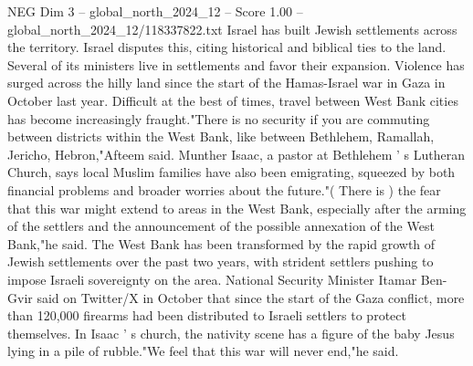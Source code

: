 \begin{textsample}{NEG Dim 3 – global\_north\_2024\_12 – Score 1.00 – global\_north\_2024\_12/118337822.txt}
Israel has built Jewish settlements across the territory.
Israel disputes this, citing historical and biblical ties to the land.
Several of its ministers live in settlements and favor their expansion.
Violence has surged across the hilly land since the start of the Hamas-Israel war in Gaza in October last year.
Difficult at the best of times, travel between West Bank cities has become increasingly fraught."There is no security if you are commuting between districts within the West Bank, like between Bethlehem, Ramallah, Jericho, Hebron,"Afteem said.
Munther Isaac, a pastor at Bethlehem ' s Lutheran Church, says local Muslim families have also been emigrating, squeezed by both financial problems and broader worries about the future."( There is ) the fear that this war might extend to areas in the West Bank, especially after the arming of the settlers and the announcement of the possible annexation of the West Bank,"he said.
The West Bank has been transformed by the rapid growth of Jewish settlements over the past two years, with strident settlers pushing to impose Israeli sovereignty on the area.
National Security Minister Itamar Ben-Gvir said on Twitter/X in October that since the start of the Gaza conflict, more than 120,000 firearms had been distributed to Israeli settlers to protect themselves.
In Isaac ' s church, the nativity scene has a figure of the baby Jesus lying in a pile of rubble."We feel that this war will never end,"he said.

\end{textsample}
